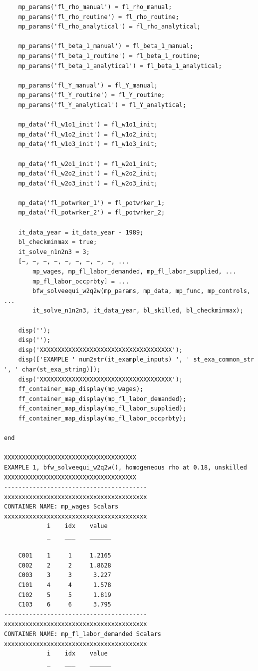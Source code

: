 \documentclass[
]{book}
\begin{document}
\begin{verbatim}
    mp_params('fl_rho_manual') = fl_rho_manual;
    mp_params('fl_rho_routine') = fl_rho_routine;
    mp_params('fl_rho_analytical') = fl_rho_analytical;

    mp_params('fl_beta_1_manual') = fl_beta_1_manual;
    mp_params('fl_beta_1_routine') = fl_beta_1_routine;
    mp_params('fl_beta_1_analytical') = fl_beta_1_analytical;

    mp_params('fl_Y_manual') = fl_Y_manual;
    mp_params('fl_Y_routine') = fl_Y_routine;
    mp_params('fl_Y_analytical') = fl_Y_analytical;

    mp_data('fl_w1o1_init') = fl_w1o1_init;
    mp_data('fl_w1o2_init') = fl_w1o2_init;
    mp_data('fl_w1o3_init') = fl_w1o3_init;

    mp_data('fl_w2o1_init') = fl_w2o1_init;
    mp_data('fl_w2o2_init') = fl_w2o2_init;
    mp_data('fl_w2o3_init') = fl_w2o3_init;

    mp_data('fl_potwrker_1') = fl_potwrker_1;
    mp_data('fl_potwrker_2') = fl_potwrker_2;

    it_data_year = it_data_year - 1989;
    bl_checkminmax = true;
    it_solve_n1n2n3 = 3;
    [~, ~, ~, ~, ~, ~, ~, ~, ~, ...
        mp_wages, mp_fl_labor_demanded, mp_fl_labor_supplied, ...
        mp_fl_labor_occprbty] = ...
        bfw_solveequi_w2q2w(mp_params, mp_data, mp_func, mp_controls, ...
        it_solve_n1n2n3, it_data_year, bl_skilled, bl_checkminmax);

    disp('');
    disp('');
    disp('XXXXXXXXXXXXXXXXXXXXXXXXXXXXXXXXXXXXX');
    disp(['EXAMPLE ' num2str(it_example_inputs) ', ' st_exa_common_str ', ' char(st_exa_string)]);
    disp('XXXXXXXXXXXXXXXXXXXXXXXXXXXXXXXXXXXXX');
    ff_container_map_display(mp_wages);
    ff_container_map_display(mp_fl_labor_demanded);
    ff_container_map_display(mp_fl_labor_supplied);
    ff_container_map_display(mp_fl_labor_occprbty);

end

XXXXXXXXXXXXXXXXXXXXXXXXXXXXXXXXXXXXX
EXAMPLE 1, bfw_solveequi_w2q2w(), homogeneous rho at 0.18, unskilled
XXXXXXXXXXXXXXXXXXXXXXXXXXXXXXXXXXXXX
----------------------------------------
xxxxxxxxxxxxxxxxxxxxxxxxxxxxxxxxxxxxxxxx
CONTAINER NAME: mp_wages Scalars
xxxxxxxxxxxxxxxxxxxxxxxxxxxxxxxxxxxxxxxx
            i    idx    value 
            _    ___    ______

    C001    1     1     1.2165
    C002    2     2     1.8628
    C003    3     3      3.227
    C101    4     4      1.578
    C102    5     5      1.819
    C103    6     6      3.795
----------------------------------------
xxxxxxxxxxxxxxxxxxxxxxxxxxxxxxxxxxxxxxxx
CONTAINER NAME: mp_fl_labor_demanded Scalars
xxxxxxxxxxxxxxxxxxxxxxxxxxxxxxxxxxxxxxxx
            i    idx    value 
            _    ___    ______


\end{verbatim}
\end{document}
